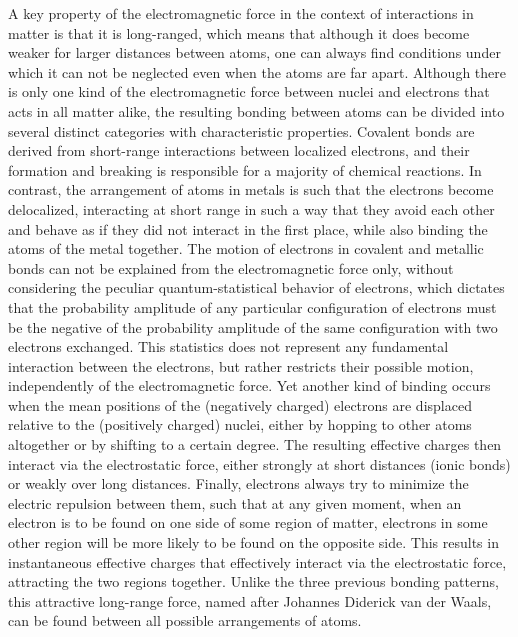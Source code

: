 A key property of the electromagnetic force in the context of interactions in matter is that it is long-ranged, which means that although it does become weaker for larger distances between atoms, one can always find conditions under which it can not be neglected even when the atoms are far apart.
Although there is only one kind of the electromagnetic force between nuclei and electrons that acts in all matter alike, the resulting bonding between atoms can be divided into several distinct categories with characteristic properties.
Covalent bonds are derived from short-range interactions between localized electrons, and their formation and breaking is responsible for a majority of chemical reactions.
In contrast, the arrangement of atoms in metals is such that the electrons become delocalized, interacting at short range in such a way that they avoid each other and behave as if they did not interact in the first place, while also binding the atoms of the metal together.
The motion of electrons in covalent and metallic bonds can not be explained from the electromagnetic force only, without considering the peculiar quantum-statistical behavior of electrons, which dictates that the probability amplitude of any particular configuration of electrons must be the negative of the probability amplitude of the same configuration with two electrons exchanged.
This statistics does not represent any fundamental interaction between the electrons, but rather restricts their possible motion, independently of the electromagnetic force.
Yet another kind of binding occurs when the mean positions of the (negatively charged) electrons are displaced relative to the (positively charged) nuclei, either by hopping to other atoms altogether or by shifting to a certain degree.
The resulting effective charges then interact via the electrostatic force, either strongly at short distances (ionic bonds) or weakly over long distances.
Finally, electrons always try to minimize the electric repulsion between them, such that at any given moment, when an electron is to be found on one side of some region of matter, electrons in some other region will be more likely to be found on the opposite side.
This results in instantaneous effective charges that effectively interact via the electrostatic force, attracting the two regions together.
Unlike the three previous bonding patterns, this attractive long-range force, named after Johannes Diderick van der Waals, can be found between all possible arrangements of atoms.

